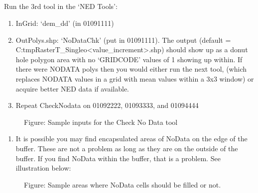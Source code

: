 \documentclass[letterpaper,10pt,english]{sphinxmanual}
\begin{document}
\subparagraph{}
\label{\detokenize{ex_1:steps-2c-2d-check-nodata-fill-nodata}}
Run the 3rd tool in the ‘NED Tools’: 
\begin{enumerate}
\def\theenumi{\arabic{enumi}}
\def\labelenumi{\theenumi .}
\makeatletter\def\p@enumii{\p@enumi \theenumi .}\makeatother
\item {} 
InGrid: ‘dem\_dd’ (in 01091111)

\item {} 
OutPolys.shp: ‘NoDataChk’ (put in 01091111).  The output (default = C:tmpRasterT\_Singleo\textless{}value\_increment\textgreater{}.shp) should show up as a donut hole polygon area with no ‘GRIDCODE’ values of 1 showing up within.  If there were NODATA polys then you would either run the next tool,  (which replaces NODATA values in a grid with mean values within a 3x3 window) or acquire better NED data if available.

\item {} 
Repeat CheckNodata on 01092222, 01093333, and 01094444

\end{enumerate}

\begin{figure}[htbp]
\centering
\capstart

\noindent{}
\caption{Figure: Sample inputs for the Check No Data tool}\label{\detokenize{ex_1:id10}}\end{figure}
\begin{enumerate}
\def\theenumi{\arabic{enumi}}
\def\labelenumi{\theenumi .}
\makeatletter\def\p@enumii{\p@enumi \theenumi .}\makeatother
\setcounter{enumi}{3}
\item {} 
It is possible you may find encapsulated areas of NoData on the edge of the buffer. These are not a problem as long as they are on the outside of the buffer. If you find NoData within the buffer, that is a problem. See illustration below:

\end{enumerate}

\begin{figure}[htbp]
\centering
\capstart

\noindent{}
\caption{Figure: Sample areas where NoData cells should be filled or not.}\label{\detokenize{ex_1:id11}}\end{figure}
\end{document}

